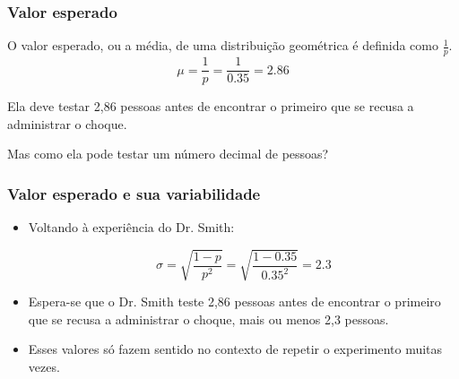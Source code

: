 \documentclass[11pt]{beamer}
\begin{document}
\begin{frame}
\frametitle{Valor esperado}


\pause

O valor esperado, ou a média, de uma distribuição geométrica é definida como $\frac{1}{p}$.
\[ \mu = \frac{1}{p} = \frac{1}{0.35} = 2.86 \]

\pause

Ela deve testar 2,86 pessoas antes de encontrar o primeiro que se recusa a administrar o choque.

\pause

Mas como ela pode testar um número decimal de pessoas?

\end{frame}


\begin{frame}
\frametitle{Valor esperado e sua variabilidade}


\pause

\begin{itemize}

\item Voltando à experiência do Dr. Smith:

\[ \sigma = \sqrt{\frac{1-p}{p^2}} = \sqrt{\frac{1-0.35}{0.35^2}} = 2.3 \]

\pause

\item Espera-se que o Dr. Smith teste 2,86 pessoas antes de encontrar o primeiro que se recusa a administrar o choque, mais ou menos 2,3 pessoas.

\pause

\item Esses valores só fazem sentido no contexto de repetir o experimento muitas vezes.

\end{itemize}

\end{frame}

\end{document}
